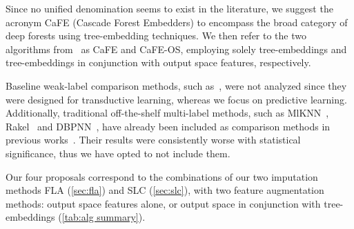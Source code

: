 \documentclass[conference,compsoc]{IEEEtran}
\begin{document}
Since no unified denomination seems to exist in the literature, we suggest the acronym CaFE (Cascade Forest Embedders) to encompass the broad category of deep forests using tree-embedding techniques.
%
We then refer to the two algorithms from~\cite{nakano2022deep} as CaFE and CaFE-OS, employing solely tree-embeddings and tree-embeddings in conjunction with output space features, respectively.

Baseline weak-label comparison methods, such as~\cite{sun2010multi, xu2013speedup}, were not analyzed since they were designed for transductive learning, whereas we focus on predictive learning. Additionally, traditional off-the-shelf multi-label methods, such as MlKNN~\cite{zhang2007ml}, Rakel~\cite{tsoumakas2007random} and DBPNN~\cite{hinton2006reducing}, have already been included as comparison methods in previous works~\cite{nakano2022deep, wang2020learning}. Their results were consistently worse with statistical significance, thus we have opted to not include them. 

Our four proposals correspond to the combinations of our two imputation methods FLA (\autoref{sec:fla}) and SLC (\autoref{sec:slc}), with two feature augmentation methods: output space features alone, or output space in conjunction with tree-embeddings (\autoref{tab:alg summary}).
\end{document}
